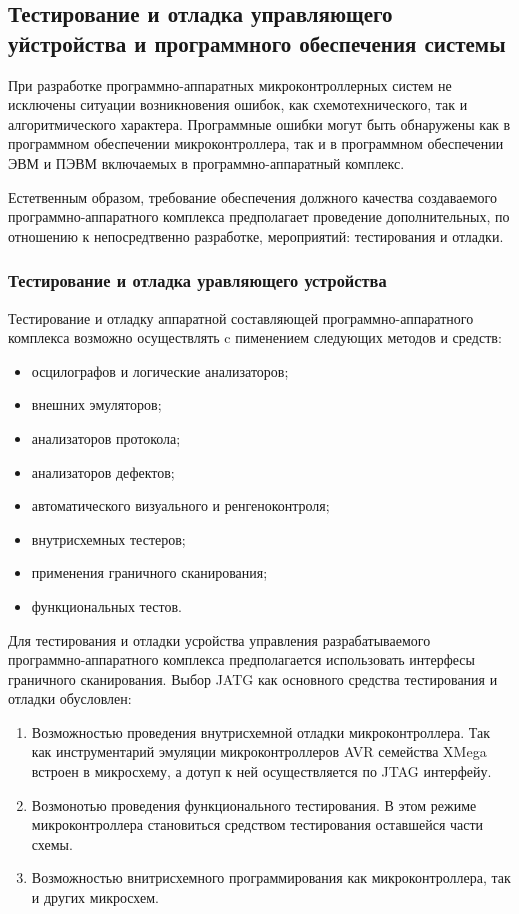 \subsection{Тестирование и отладка управляющего уйстройства и программного обеспечения системы}
При разработке программно-аппаратных микроконтроллерных систем не исключены ситуации возникновения
ошибок, как схемотехнического, так и алгоритмического характера. Программные ошибки могут быть обнаружены
как в программном обеспечении микроконтроллера, так и в программном обеспечении ЭВМ и ПЭВМ включаемых
в программно-аппаратный комплекс.

Естетвенным образом, требование обеспечения должного качества создаваемого программно-аппаратного
комплекса предполагает проведение дополнительных, по отношению к непосредтвенно разработке,
мероприятий: тестирования и отладки.


\subsubsection{Тестирование и отладка уравляющего устройства}
Тестирование и отладку аппаратной составляющей программно-аппаратного комплекса возможно осуществлять
c пименением следующих методов и средств:
\begin{itemize}
	\item{} осцилографов и логические анализаторов;
	\item{} внешних эмуляторов;
	\item{} анализаторов протокола;
	\item{} анализаторов дефектов;
	\item{} автоматического визуального и ренгеноконтроля;
	\item{} внутрисхемных тестеров;
	\item{} применения граничного сканирования;
	\item{} функциональных тестов.
\end{itemize}

Для тестирования и отладки усройства управления разрабатываемого программно-аппаратного комплекса
предполагается использовать интерфесы граничного сканирования. Выбор JATG как основного
средства тестирования и отладки обусловлен:
\begin{enumerate}
	\item{} Возможностью проведения внутрисхемной отладки микроконтроллера. Так как инструментарий эмуляции микроконтроллеров AVR
	семейства XMega встроен в микросхему, а дотуп к ней осуществляется по JTAG интерфейу.
	\item{} Возмонотью проведения функционального тестирования. В этом режиме микроконтроллера становиться средством тестирования
	оставшейся части схемы.
	\item{} Возможностью внитрисхемного программирования как микроконтроллера, так и других микросхем.
\end{enumerate}


